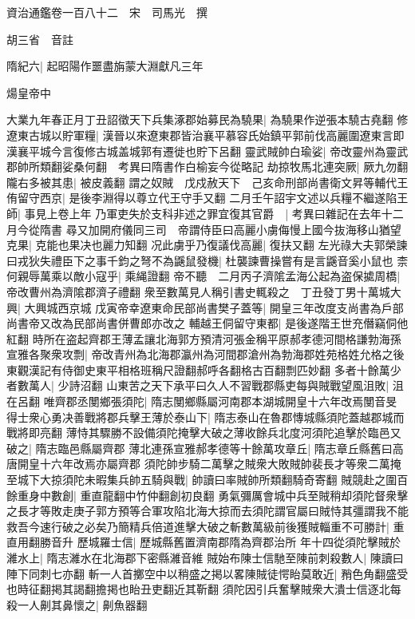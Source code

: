 資治通鑑卷一百八十二　宋　司馬光　撰

胡三省　音註

隋紀六|{
	起昭陽作噩盡旃蒙大淵獻凡三年}


煬皇帝中

大業九年春正月丁丑詔徵天下兵集涿郡始募民為驍果|{
	為驍果作逆張本驍古堯翻}
修遼東古城以貯軍糧|{
	漢晉以來遼東郡皆治襄平慕容氏始鎮平郭前伐高麗圍遼東言即漢襄平城今言復修古城盖城郭有遷徙也貯下呂翻}
靈武賊帥白瑜娑|{
	帝改靈州為靈武郡帥所類翻娑桑何翻　考異曰隋書作白榆妄今從略記}
劫掠牧馬北連突厥|{
	厥九勿翻}
隴右多被其患|{
	被皮義翻}
謂之奴賊　戊戍赦天下　己亥命刑部尚書衛文昇等輔代王侑留守西京|{
	是後李淵得以尊立代王守手又翻}
二月壬午詔宇文述以兵糧不繼遂陷王師|{
	事見上卷上年}
乃軍吏失於支科非述之罪宜復其官爵　|{
	考異曰雜記在去年十二月今從隋書}
尋又加開府儀同三司　帝謂侍臣曰高麗小虜侮慢上國今抜海移山猶望克果|{
	克能也果决也麗力知翻}
况此虜乎乃復議伐高麗|{
	復扶又翻}
左光祿大夫郭榮諫曰戎狄失禮臣下之事千鈞之弩不為鼷鼠發機|{
	杜襲諫曹操嘗有是言鼷音奚小鼠也}
柰何親辱萬乘以敵小寇乎|{
	乘䋲證翻}
帝不聽　二月丙子濟隂孟海公起為盗保㨿周橋|{
	帝改曹州為濟隂郡濟子禮翻}
衆至數萬見人稱引書史輒殺之　丁丑發丁男十萬城大興|{
	大興城西京城}
戊寅帝幸遼東命民部尚書樊子蓋等|{
	開皇三年改度支尚書為戶部尚書帝又改為民部尚書併曹郎亦改之}
輔越王侗留守東都|{
	是後遂階王世充僭竊侗他紅翻}
時所在盗起齊郡王薄孟讓北海郭方預清河張金稱平原郝孝德河間格謙勃海孫宣雅各聚衆攻剽|{
	帝改青州為北海郡瀛州為河間郡滄州為勃海郡姓苑格姓允格之後東觀漢記有侍御史東平相格班稱尺證翻郝呼各翻格古百翻剽匹妙翻}
多者十餘萬少者數萬人|{
	少詩沼翻}
山東苦之天下承平曰久人不習戰郡縣吏每與賊戰望風沮敗|{
	沮在呂翻}
唯齊郡丞閺鄉張須陀|{
	隋志閺鄉縣屬河南郡本湖城開皇十六年改焉閺音旻}
得士衆心勇决善戰將郡兵擊王薄於泰山下|{
	隋志泰山在魯郡慱城縣須陀蓋越郡城而戰將即亮翻}
薄恃其驟勝不設備須陀掩擊大破之薄收餘兵北度河須陀追擊於臨邑又破之|{
	隋志臨邑縣屬齊郡}
薄北連孫宣雅郝孝德等十餘萬攻章丘|{
	隋志章丘縣舊曰高唐開皇十六年改焉亦屬齊郡}
須陀帥步騎二萬擊之賊衆大敗賊帥裴長才等衆二萬掩至城下大掠須陀未暇集兵帥五騎與戰|{
	帥讀曰率賊帥所類翻騎奇寄翻}
賊競赴之圍百餘重身中數創|{
	重直龍翻中竹仲翻創初良翻}
勇氣彌厲會城中兵至賊稍却須陀督衆擊之長才等敗走庚子郭方預等合軍攻陷北海大掠而去須陀謂官屬曰賊恃其彊謂我不能救吾今速行破之必矣乃簡精兵倍道進擊大破之斬數萬級前後獲賊輜重不可勝計|{
	重直用翻勝音升}
歷城羅士信|{
	歷城縣舊置濟南郡隋為齊郡治所}
年十四從須陀擊賊於濰水上|{
	隋志濰水在北海郡下密縣濰音維}
賊始布陳士信馳至陳前刺殺數人|{
	陳讀曰陣下同刺七亦翻}
斬一人首擲空中以稍盛之掲以畧陳賊徒愕眙莫敢近|{
	矟色角翻盛受也時征翻掲其謁翻擔掲也眙丑吏翻近其靳翻}
須陀因引兵奮擊賊衆大潰士信逐北每殺一人劓其鼻懷之|{
	劓魚器翻}
